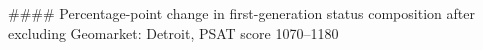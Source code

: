 #### Percentage-point change in first-generation status composition after excluding Geomarket: Detroit, PSAT score 1070–1180
